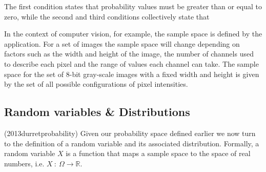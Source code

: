 The first condition states that probability values must be greater than or equal to zero, while the second and third conditions collectively state that 

In the context of computer vision, for example, the sample space is defined by the application. For a set of images the sample space will change depending on factors such as the width and height of the image, the number of channels used to describe each pixel and the range of values each channel can take. The sample space for the set of 8-bit gray-scale images with a fixed width and height is given by the set of all possible configurations of pixel intensities. 

\subsection{Random variables \& Distributions}

(2013durretprobability)
Given our probability space defined earlier we now turn to the definition of a random variable and its associated distribution. Formally, a random variable $X$ is a function that maps a sample space to the space of real numbers, i.e. $X\: : \: \Omega \rightarrow \mathbb{R}$. 